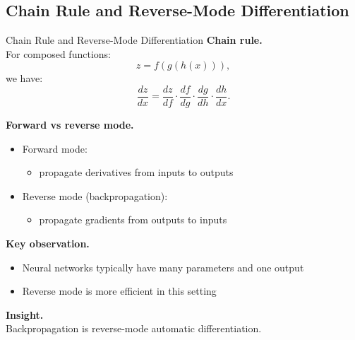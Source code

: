 \documentclass[aspectratio=169,11pt]{beamer}
\begin{document}
\subsection{Chain Rule and Reverse-Mode Differentiation}
\begin{frame}[t,allowframebreaks]{Chain Rule and Reverse-Mode Differentiation}
\small
\textbf{Chain rule.}\\ For composed functions:
\[
z = f(g(h(x))),
\]
we have:
\[
\frac{dz}{dx} = \frac{dz}{df} \cdot \frac{df}{dg} \cdot \frac{dg}{dh} \cdot \frac{dh}{dx}.
\]

\textbf{Forward vs reverse mode.}\\ \begin{itemize}
    \item Forward mode:
    \begin{itemize}
        \item propagate derivatives from inputs to outputs
    \end{itemize}

    \item Reverse mode (backpropagation):
    \begin{itemize}
        \item propagate gradients from outputs to inputs
    \end{itemize}
\end{itemize}

\textbf{Key observation.}\\ \begin{itemize}
    \item Neural networks typically have many parameters and one output
    \item Reverse mode is more efficient in this setting
\end{itemize}

\textbf{Insight.}\\ Backpropagation is reverse-mode automatic differentiation.
\end{frame}
\end{document}
